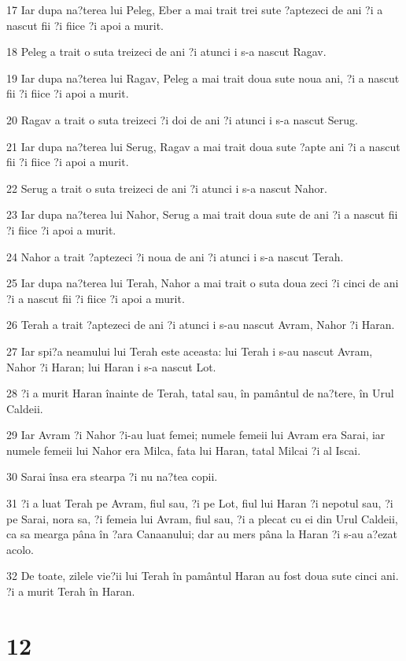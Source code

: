 \par 17 Iar dupa na?terea lui Peleg, Eber a mai trait trei sute ?aptezeci de ani ?i a nascut fii ?i fiice ?i apoi a murit.
\par 18 Peleg a trait o suta treizeci de ani ?i atunci i s-a nascut Ragav.
\par 19 Iar dupa na?terea lui Ragav, Peleg a mai trait doua sute noua ani, ?i a nascut fii ?i fiice ?i apoi a murit.
\par 20 Ragav a trait o suta treizeci ?i doi de ani ?i atunci i s-a nascut Serug.
\par 21 Iar dupa na?terea lui Serug, Ragav a mai trait doua sute ?apte ani ?i a nascut fii ?i fiice ?i apoi a murit.
\par 22 Serug a trait o suta treizeci de ani ?i atunci i s-a nascut Nahor.
\par 23 Iar dupa na?terea lui Nahor, Serug a mai trait doua sute de ani ?i a nascut fii ?i fiice ?i apoi a murit.
\par 24 Nahor a trait ?aptezeci ?i noua de ani ?i atunci i s-a nascut Terah.
\par 25 Iar dupa na?terea lui Terah, Nahor a mai trait o suta doua zeci ?i cinci de ani ?i a nascut fii ?i fiice ?i apoi a murit.
\par 26 Terah a trait ?aptezeci de ani ?i atunci i s-au nascut Avram, Nahor ?i Haran.
\par 27 Iar spi?a neamului lui Terah este aceasta: lui Terah i s-au nascut Avram, Nahor ?i Haran; lui Haran i s-a nascut Lot.
\par 28 ?i a murit Haran înainte de Terah, tatal sau, în pamântul de na?tere, în Urul Caldeii.
\par 29 Iar Avram ?i Nahor ?i-au luat femei; numele femeii lui Avram era Sarai, iar numele femeii lui Nahor era Milca, fata lui Haran, tatal Milcai ?i al Iscai.
\par 30 Sarai însa era stearpa ?i nu na?tea copii.
\par 31 ?i a luat Terah pe Avram, fiul sau, ?i pe Lot, fiul lui Haran ?i nepotul sau, ?i pe Sarai, nora sa, ?i femeia lui Avram, fiul sau, ?i a plecat cu ei din Urul Caldeii, ca sa mearga pâna în ?ara Canaanului; dar au mers pâna la Haran ?i s-au a?ezat acolo.
\par 32 De toate, zilele vie?ii lui Terah în pamântul Haran au fost doua sute cinci ani. ?i a murit Terah în Haran.

\chapter{12}

